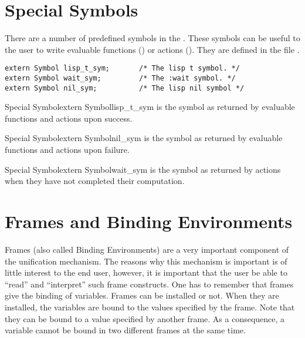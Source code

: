 \section{Special Symbols}

There are a number of predefined symbols in the \CPK{}. These symbols can be
useful to the user to write evaluable functions ()
or actions (). They are defined in the file  .

\begin{verbatim}
extern Symbol lisp_t_sym;       /* The lisp t symbol. */
extern Symbol wait_sym;         /* The :wait symbol. */
extern Symbol nil_sym;          /* The lisp nil symbol */
\end{verbatim}

\begin{typevr}{Special Symbol}{extern Symbol}{lisp\_t\_sym}
is the  symbol as returned by evaluable functions and actions upon
success. 
\end{typevr}

\begin{typevr}{Special Symbol}{extern Symbol}{nil\_sym}
is the  symbol as returned by evaluable functions and actions upon
failure.  
\end{typevr}

\begin{typevr}{Special Symbol}{extern Symbol}{wait\_sym}
is the  symbol as returned by actions when they have not completed
their computation. 
\end{typevr}

\section{Frames and Binding Environments}

Frames (also called Binding Environments) are a very important component of the
unification mechanism. The reasons why this mechanism is important is of little
interest to the end user, however, it is important that the user be able to
``read'' and ``interpret'' such frame constructs. One has to remember that
frames give the binding of variables. Frames can be installed or not. When they
are installed, the variables are bound to the values specified by the frame.
Note that they can be bound to a value specified by another frame. As a
consequence, a variable cannot be bound in two different frames at the same
time.

